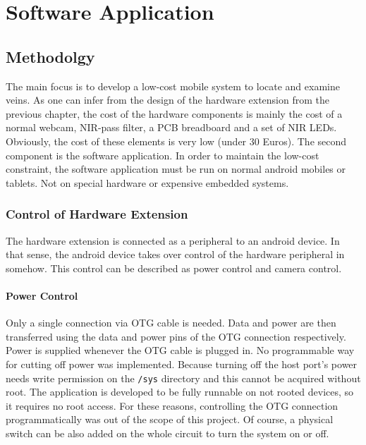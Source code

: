 
\chapter{Software Application}\label{Software Application}

\section{Methodolgy}
The main focus is to develop a low-cost mobile system to locate and examine veins. As one can infer from the design of the hardware extension from the previous chapter, the cost of the hardware components is mainly the cost of a normal webcam, NIR-pass filter, a PCB breadboard and a set of NIR LEDs. Obviously, the cost of these elements is very low (under 30 Euros). The second component is the software application. In order to maintain the low-cost constraint, the software application must be run on normal android mobiles or tablets. Not on special hardware or expensive embedded systems.

\subsection{Control of Hardware Extension}

The hardware extension is connected as a peripheral to an android device. In that sense, the android device takes over control of the hardware peripheral in somehow. This control can be described as power control and camera control.

\subsubsection{Power Control}
Only a single connection via OTG cable is needed. Data and power are then transferred using the data and power pins of the OTG connection respectively. Power is supplied whenever the OTG cable is plugged in. No programmable way for cutting off power was implemented. Because turning off the host port’s power needs write permission on the \texttt{/sys} directory and this cannot be acquired without root. The application is developed to be fully runnable on not rooted devices, so it requires no root access. For these reasons, controlling the OTG connection programmatically was out of the scope of this project. Of course, a physical switch can be also added on the whole circuit to turn the system on or off. 

